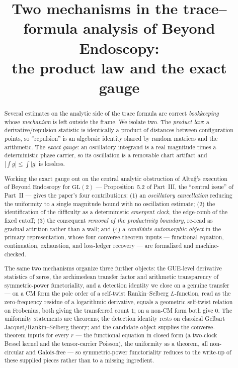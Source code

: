 \documentclass[11pt]{article}
\title{Two mechanisms in the trace--formula analysis of Beyond Endoscopy:\\
the product law and the exact gauge}
\author{}
\date{}
\theoremstyle{definition}
\begin{document}
\maketitle

\begin{abstract}
Several estimates on the analytic side of the trace formula are correct \emph{bookkeeping} whose
\emph{mechanism} is left outside the frame. We isolate two. The \emph{product law}: a
derivative/repulsion statistic is identically a product of distances between configuration points, so
``repulsion'' is an algebraic identity shared by random matrices and the arithmetic. The \emph{exact
gauge}: an oscillatory integrand is a real magnitude times a deterministic phase carrier, so its
oscillation is a removable chart artifact and $|\int g|\le\int|g|$ is lossless.

Working the exact gauge out on the central analytic obstruction of Altu\u{g}'s execution of Beyond
Endoscopy for $\mathrm{GL}(2)$ --- Proposition~5.2 of Part~III, the ``central issue'' of Part~II ---
gives the paper's four contributions: (1) an \emph{oscillatory cancellation} reducing the uniformity
to a single magnitude bound with no oscillation estimate; (2) the identification of the difficulty as
a deterministic \emph{emergent clock}, the edge-comb of the fixed cutoff; (3) the consequent
\emph{removal of the productivity boundary}, re-read as gradual attrition rather than a wall; and (4)
a \emph{candidate automorphic object} in the primary representation, whose four converse-theorem
inputs --- functional equation, continuation, exhaustion, and loss-ledger recovery --- are formalized
and machine-checked.

The same two mechanisms organize three further objects: the GUE-level derivative statistics of zeros,
the archimedean transfer factor and arithmetic transparency of symmetric-power functoriality, and a
detection identity we close on a genuine transfer --- on a CM form the pole order of a self-twist
Rankin--Selberg $L$-function, read as the zero-frequency residue of a logarithmic derivative, equals a
geometric self-twist relation on Frobenius, both giving the transferred count $1$; on a non-CM form
both give $0$. The uniformity statements are theorems; the detection identity rests on classical
Gelbart--Jacquet/Rankin--Selberg theory; and the candidate object supplies the converse-theorem inputs
for every $r$ --- the functional equation in closed form (a two-clock Bessel kernel and the
tensor-carrier Poisson), the uniformity as a theorem, all non-circular and Galois-free --- so
symmetric-power functoriality reduces to the write-up of these supplied pieces rather than to a missing
ingredient.
\end{abstract}
\end{document}

